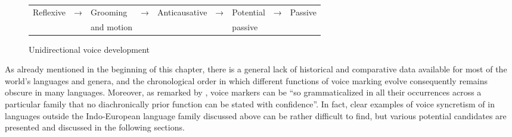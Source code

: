 \begin{figure}
	\caption{Unidirectional voice development \citep{haspelmath:2003}}
	\label{fig:ch7:unidirectional}
	\setlength{\tabcolsep}{2pt}
	\begin{tabularx}{0.88\textwidth}{lllllllll}
		Reflexive & → & Grooming\is{grooming} & → & Anticausative & → & Potential & → & Passive \\
		& & and motion & & & & passive & & \\
	\end{tabularx}
\end{figure}

As already mentioned in the beginning of this chapter, there is a general lack of historical and comparative data available for most of the world’s languages and genera, and the chronological order in which different functions of voice marking evolve consequently remains obscure in many languages. Moreover, as remarked by \cite[197]{kemmer:1993}, voice markers can be “so grammaticalized in all their occurrences across a particular family that no diachronically prior function can be stated with confidence”. In fact, clear examples of voice syncretism of  in languages outside the Indo-European language family discussed above can be rather difficult to find, but various potential candidates are presented and discussed in the following sections.

